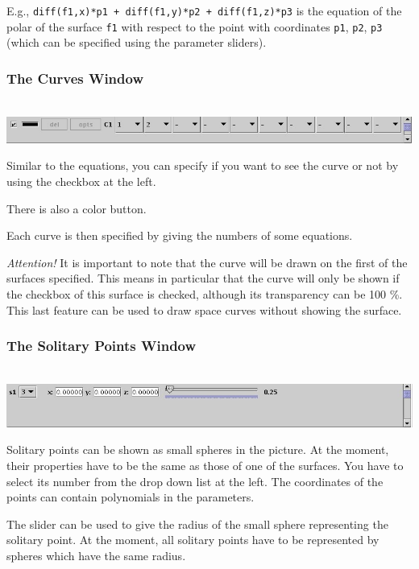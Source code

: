 \documentclass{article}
\newcommand{\attention}{\emph{Attention!}}
\begin{document}
E.g.,
{\tt diff(f1,x)*p1 + diff(f1,y)*p2 + diff(f1,z)*p3}
is the equation of the polar of the surface {\tt f1} with respect to the point
with coordinates {\tt p1}, {\tt p2}, {\tt p3} (which can be specified using
the parameter sliders).


\subsubsection{The Curves Window}

\ \\\includegraphics[scale=0.35]{surfex_curves}

Similar to the equations, you can specify if you want to see the curve or not
by using the checkbox at the left.

There is also a color button.

Each curve is then specified by giving the numbers of some equations.

\attention{}
It is important to note that the curve will be drawn on the first of the
surfaces specified.
This means in particular that the curve will only be shown if the checkbox of
this surface is checked, although its transparency can be 100 \%.
This last feature can be used to draw space curves without showing the
surface.


\subsubsection{The Solitary Points Window}

\ \\\includegraphics[scale=0.35]{surfex_points}

Solitary points can be shown as small spheres in the picture.
At the moment, their properties have to be the same as those of one of the
surfaces.
You have to select its number from the drop down list at the left.
The coordinates of the points can contain polynomials in the parameters.

The slider can be used to give the radius of the small sphere representing the
solitary point.
At the moment, all solitary points have to be represented by spheres which
have the same radius.
\end{document}

